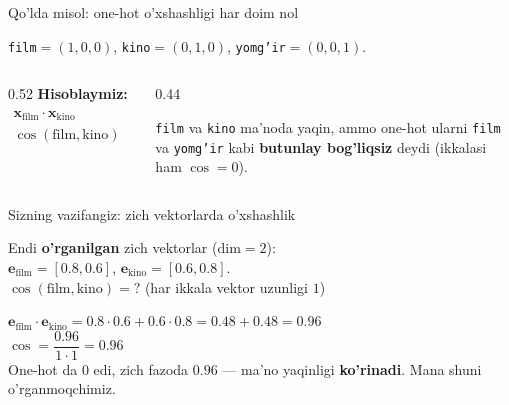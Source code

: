 \documentclass[aspectratio=169,11pt]{beamer}
\begin{document}
\begin{frame}{Qo'lda misol: one-hot o'xshashligi har doim nol}
  \begin{tcolorbox}[defbox,title={Lug'at: (film, kino, yomg'ir), |V|=3}]
    \small
    \texttt{film}$=(1,0,0)$, \quad \texttt{kino}$=(0,1,0)$, \quad
    \texttt{yomg'ir}$=(0,0,1)$.
  \end{tcolorbox}
  \vspace{0.2em}
  \begin{columns}[T]
    \begin{column}{0.52\textwidth}
      \textbf{Hisoblaymiz:}
      \begin{align*}
        \mathbf{x}_{\text{film}}\cdot\mathbf{x}_{\text{kino}}
          &= 1{\cdot}0 + 0{\cdot}1 + 0{\cdot}0 = 0\\
        \cos(\text{film},\text{kino}) &= \frac{0}{1\cdot 1} = \mathbf{0}
      \end{align*}
    \end{column}
    \begin{column}{0.44\textwidth}
      \begin{tcolorbox}[okbox,top=2pt,bottom=2pt]
        \footnotesize
        \texttt{film} va \texttt{kino} ma'noda yaqin, ammo one-hot ularni
        \texttt{film} va \texttt{yomg'ir} kabi \textbf{butunlay bog'liqsiz}
        deydi (ikkalasi ham $\cos=0$).
      \end{tcolorbox}
    \end{column}
  \end{columns}
\end{frame}

\begin{frame}{Sizning vazifangiz: zich vektorlarda o'xshashlik}
  \begin{tcolorbox}[warnbox,title=Savol --- 90 soniya]
    \small
    Endi \textbf{o'rganilgan} zich vektorlar (dim$=2$):\\[3pt]
    $\mathbf{e}_{\text{film}}=[0.8,0.6]$, \quad $\mathbf{e}_{\text{kino}}=[0.6,0.8]$.\\[4pt]
    \textbf{\large $\cos(\text{film},\text{kino}) = ?$} \quad (har ikkala vektor uzunligi $1$)
  \end{tcolorbox}
  \pause
  \begin{tcolorbox}[okbox,title=Javob]
    \small
    $\mathbf{e}_{\text{film}}\cdot\mathbf{e}_{\text{kino}} = 0.8{\cdot}0.6 + 0.6{\cdot}0.8 = 0.48+0.48 = 0.96$\\[3pt]
    $\cos = \dfrac{0.96}{1\cdot 1} = \mathbf{0.96}$\\[3pt]
    \footnotesize One-hot da $0$ edi, zich fazoda $0.96$ --- ma'no yaqinligi
    \textbf{ko'rinadi}. Mana shuni o'rganmoqchimiz.
  \end{tcolorbox}
\end{frame}
\end{document}

